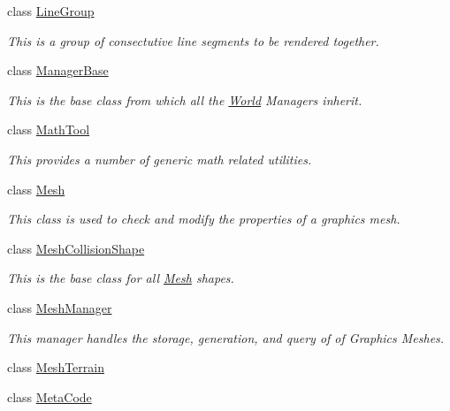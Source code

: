 \begin{DoxyCompactItemize}
class \hyperlink{classMezzanine_1_1LineGroup}{LineGroup}
\begin{DoxyCompactList}\small\item\em This is a group of consectutive line segments to be rendered together. \item\end{DoxyCompactList}\item 
class \hyperlink{classMezzanine_1_1ManagerBase}{ManagerBase}
\begin{DoxyCompactList}\small\item\em This is the base class from which all the \hyperlink{classMezzanine_1_1World}{World} Managers inherit. \item\end{DoxyCompactList}\item 
class \hyperlink{classMezzanine_1_1MathTool}{MathTool}
\begin{DoxyCompactList}\small\item\em This provides a number of generic math related utilities. \item\end{DoxyCompactList}\item 
class \hyperlink{classMezzanine_1_1Mesh}{Mesh}
\begin{DoxyCompactList}\small\item\em This class is used to check and modify the properties of a graphics mesh. \item\end{DoxyCompactList}\item 
class \hyperlink{classMezzanine_1_1MeshCollisionShape}{MeshCollisionShape}
\begin{DoxyCompactList}\small\item\em This is the base class for all \hyperlink{classMezzanine_1_1Mesh}{Mesh} shapes. \item\end{DoxyCompactList}\item 
class \hyperlink{classMezzanine_1_1MeshManager}{MeshManager}
\begin{DoxyCompactList}\small\item\em This manager handles the storage, generation, and query of of Graphics Meshes. \item\end{DoxyCompactList}\item 
class \hyperlink{classMezzanine_1_1MeshTerrain}{MeshTerrain}
\item 
class \hyperlink{classMezzanine_1_1MetaCode}{MetaCode}

\end{DoxyCompactItemize}
